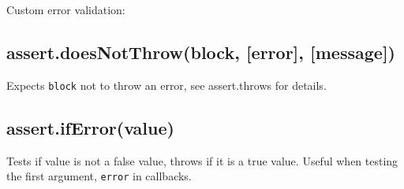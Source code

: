 Custom error validation:

\begin{Shaded}
\begin{Highlighting}[]
\NormalTok{(}
  \NormalTok{() \{}
      \NormalTok{);}
  \NormalTok{\},}
     
       \NormalTok{;}
    \NormalTok{\}}
  \NormalTok{\},}
\NormalTok{);}
\end{Highlighting}
\end{Shaded}

\subsection{assert.doesNotThrow(block, {[}error{]}, {[}message{]})}

Expects \texttt{block} not to throw an error, see assert.throws for
details.

\subsection{assert.ifError(value)}

Tests if value is not a false value, throws if it is a true value.
Useful when testing the first argument, \texttt{error} in callbacks.
